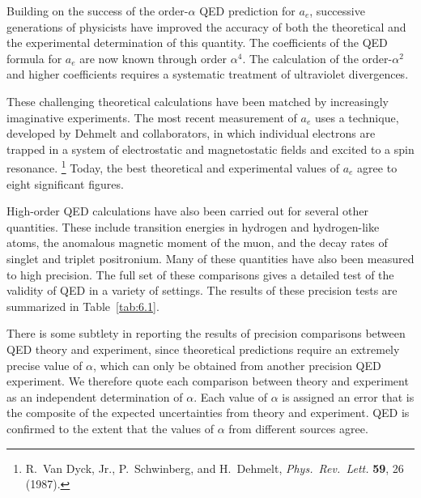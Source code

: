 Building on the success of the order-$\alpha$ QED prediction for $a_e$,
successive generations of physicists have improved the accuracy of both the
theoretical and the experimental determination of this quantity.  The
coefficients of the QED formula for $a_e$ are now known through order
$\alpha^4$.  The calculation of the order-$\alpha^2$ and higher coefficients
requires a systematic treatment of ultraviolet divergences.

These challenging theoretical calculations have been matched by increasingly
imaginative experiments.  The most recent measurement of $a_e$ uses a
technique, developed by Dehmelt and collaborators, in which individual
electrons are trapped in a system of electrostatic and magnetostatic fields
and excited to a spin resonance.%
\footnote{R.~Van Dyck, Jr., P.~Schwinberg, and H.~Dehmelt, \emph{Phys.\ Rev.\
Lett.} \textbf{59}, 26 (1987).}  Today, the best theoretical and experimental
values of $a_e$ agree to eight significant figures.

High-order QED calculations have also been carried out for several other
quantities.  These include transition energies in hydrogen and hydrogen-like
atoms, the anomalous magnetic moment of the muon, and the decay rates of
singlet and triplet positronium.  Many of these quantities have also been
measured to high precision.  The full set of these comparisons gives a detailed
test of the validity of QED in a variety of settings.  The results of these
precision tests are summarized in Table~\ref{tab:6.1}.

There is some subtlety in reporting the results of precision comparisons
between QED theory and experiment, since theoretical predictions require an
extremely precise value of $\alpha$, which can only be obtained from another
precision QED experiment.  We therefore quote each comparison between theory
and experiment as an independent determination of $\alpha$.  Each value of
$\alpha$ is assigned an error that is the composite of the expected
uncertainties from theory and experiment.  QED is confirmed to the extent that
the values of $\alpha$ from different sources agree.

